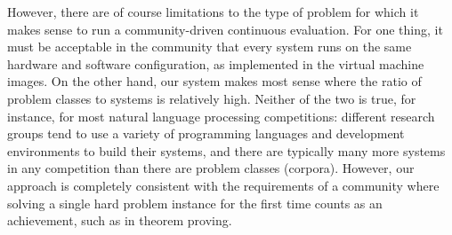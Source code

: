 However, there are of course limitations to the type of problem for
which it makes sense to run a community-driven continuous evaluation.
For one thing, it must be acceptable in the community that every
system runs on the same hardware and software configuration, as
implemented in the virtual machine images.  On the other hand, our
system makes most sense where the ratio of problem classes to systems
is relatively high.  Neither of the two is true, for instance, for
most natural language processing competitions: different research
groups tend to use a variety of programming languages and development
environments to build their systems, and there are typically many more
systems in any competition than there are problem classes (corpora).
However, our approach is completely consistent with the requirements
of a community where solving a single hard problem instance for the
first time counts as an achievement, such as in theorem proving.




